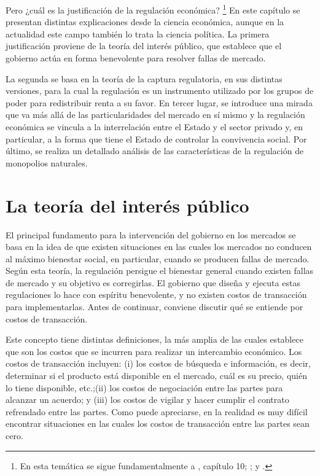 \documentclass[
  12pt,
  spanish,
]{book}
\begin{document}
Pero ¿cuál es la justificación de la regulación económica?
\footnote{En esta temática se sigue fundamentalmente a \citet{Viscusi2005}, capítulo 10; \citet{Hertog1999}; y \citet{Noll1989}.}
En este capítulo se presentan distintas explicaciones desde la ciencia económica, aunque en la actualidad este campo también lo trata la ciencia política. La primera justificación proviene de la teoría del interés público, que establece que el gobierno actúa en forma benevolente para resolver fallas de mercado.

La segunda se basa en la teoría de la captura regulatoria, en sus distintas versiones, para la cual la regulación es un instrumento utilizado por los grupos de poder para redistribuir renta a su favor. En tercer lugar, se introduce una mirada que va más allá de las particularidades del mercado en sí mismo y la regulación económica se vincula a la interrelación entre el Estado y el sector privado y, en particular, a la forma que tiene el Estado de controlar la convivencia social. Por último, se realiza un detallado análisis de las características de la regulación de monopolios naturales.

\hypertarget{la-teoruxeda-del-interuxe9s-puxfablico}{%
\section{La teoría del interés público}\label{la-teoruxeda-del-interuxe9s-puxfablico}}

El principal fundamento para la intervención del gobierno en los mercados se basa en la idea de que existen situaciones en las cuales los mercados no conducen al máximo bienestar social, en particular, cuando se producen fallas de mercado. Según esta teoría, la regulación persigue el bienestar general cuando existen fallas de mercado y su objetivo es corregirlas. El gobierno que diseña y ejecuta estas regulaciones lo hace con espíritu benevolente, y no existen costos de transacción para implementarlas. Antes de continuar, conviene discutir qué se entiende por costos de transacción.

Este concepto tiene distintas definiciones, la más amplia de las cuales establece que son los costos que se incurren para realizar un intercambio económico. Los costos de transacción incluyen: (i) los costos de búsqueda e información, es decir, determinar si el producto está disponible en el mercado, cuál es su precio, quién lo tiene disponible, etc.;(ii) los costos de negociación entre las partes para alcanzar un acuerdo; y (iii) los costos de vigilar y hacer cumplir el contrato refrendado entre las partes. Como puede apreciarse, en la realidad es muy difícil encontrar situaciones en las cuales los costos de transacción entre las partes sean cero.
\end{document}
